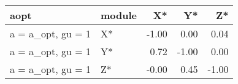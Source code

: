 \documentclass[10pt,a4paper]{article}
\begin{document}
\begin{table}[ht]
\centering
\begin{tabular}{llrrr}
  \hline
aopt & module & X* & Y* & Z* \\ 
  \hline
a = a\_opt, gu = 1 & X* & -1.00 & 0.00 & 0.04 \\ 
  a = a\_opt, gu = 1 & Y* & 0.72 & -1.00 & 0.00 \\ 
  a = a\_opt, gu = 1 & Z* & -0.00 & 0.45 & -1.00 \\ 
   \hline
\end{tabular}
\end{table}
 
\end{document}
